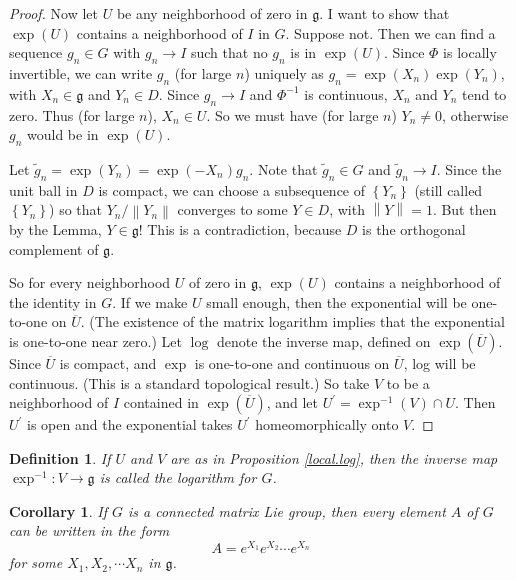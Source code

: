 \documentclass{amsbook}
\let \frak = \mathfrak
\theoremstyle{plain}
\newtheorem{corollary}[theorem]{Corollary}
\newtheorem{definition}[theorem]{Definition}
\numberwithin{equation}{chapter}
\numberwithin{theorem}{chapter}
\begin{document}
\begin{proof}
Now let $U$ be any neighborhood of zero in $\frak{g}$. I want to show that
$\exp\left(  U\right)  $ contains a neighborhood of $I$ in $G$. Suppose not.
Then we can find a sequence $g_{n}\in G$ with $g_{n}\rightarrow I$ such that
no $g_{n}$ is in $\exp\left(  U\right)  $. Since $\Phi$ is locally invertible,
we can write $g_{n}$ (for large $n$) uniquely as $g_{n}=\exp\left(
X_{n}\right)  \exp\left(  Y_{n}\right)  $, with $X_{n}\in\frak{g}$ and
$Y_{n}\in D$. Since $g_{n}\rightarrow I$ and $\Phi^{-1}$ is continuous,
$X_{n}$ and $Y_{n}$ tend to zero. Thus (for large $n$), $X_{n}\in U$. So we
must have (for large $n$) $Y_{n}\neq0$, otherwise $g_{n}$ would be in
$\exp\left(  U\right)  $.

Let $\widetilde{g}_{n}=\exp\left(  Y_{n}\right)  =\exp\left(  -X_{n}\right)
g_{n}$. Note that $\widetilde{g}_{n}\in G$ and $\widetilde{g}_{n}\rightarrow
I$. Since the unit ball in $D$ is compact, we can choose a subsequence of
$\left\{  Y_{n}\right\}  $ (still called $\left\{  Y_{n}\right\}  $) so that
$Y_{n}/\left\|  Y_{n}\right\|  $ converges to some $Y\in D$, with $\left\|
Y\right\|  =1$. But then by the Lemma, $Y\in\frak{g}$! This is a
contradiction, because $D$ is the orthogonal complement of $\frak{g}$.

So for every neighborhood $U$ of zero in $\frak{g}$, $\exp\left(  U\right)  $
contains a neighborhood of the identity in $G$. If we make $U$ small enough,
then the exponential will be one-to-one on $\overline{U}$. (The existence of
the matrix logarithm implies that the exponential is one-to-one near zero.)
Let $\log$ denote the inverse map, defined on $\exp\left(  \overline
{U}\right)  $. Since $\overline{U}$ is compact, and $\exp$ is one-to-one and
continuous on $\overline{U}$, log will be continuous. (This is a standard
topological result.) So take $V$ to be a neighborhood of $I$ contained in
$\exp\left(  \overline{U}\right)  $, and let $U^{\prime}=\exp^{-1}\left(
V\right)  \cap U$. Then $U^{\prime}$ is open and the exponential takes
$U^{\prime}$ homeomorphically onto $V$.
\end{proof}

\begin{definition}
If $U$ and $V$ are as in Proposition \ref{local.log}, then the inverse map
$\exp^{-1}:V\rightarrow\frak{g}$ is called the logarithm for $G$.
\end{definition}

\begin{corollary}
\label{ex1.ex2}If $G$ is a connected matrix Lie group, then every element $A$
of $G$ can be written in the form
\begin{equation}
A=e^{X_{1}}e^{X_{2}}\cdots e^{X_{n}}\label{exp.n}%
\end{equation}
for some $X_{1},X_{2},\cdots X_{n}$ in $\frak{g}$.
\end{corollary}
\end{document}
